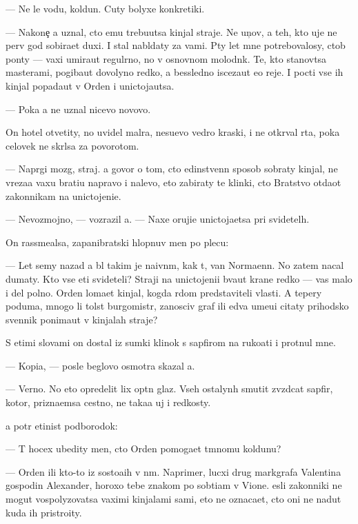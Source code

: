 \documentclass[10pt]{book}
\begin{document}
— Ne le{\y} vodu, koldun. Cuty bolyxe konkretiki.

— Nakone{\c} {\y}a uznal, cto {\y}emu trebu{\y}utsa kinjal{\yi} straje{\y}. Ne {\y}un{\c}ov, a teh, kto uje ne perv{\yi}{\y} god sobira{\y}et duxi. I stal nabl{\io}daty za vami. P{\ia}ty let mne potrebovalosy, ctob{\yi} pon{\ia}ty — vaxi umira{\y}ut regul{\ia}rno, no v osnovnom molodn{\ia}k. Te, kto stanov{\ia}tsa masterami, pogiba{\y}ut dovolyno redko, a bessledno isceza{\y}ut {\y}e{\x}o reje. I pocti vse ih kinjal{\yi} popada{\y}ut v Orden i unictoja{\y}utsa.

— Poka {\y}a ne uznal nicevo novovo.

On hotel otvetity, no uvidel mal{\ia}ra, nesu{\x}evo vedro kraski, i ne otkr{\yi}val rta, poka celovek ne skr{\yi}lsa za povorotom.

— Napr{\ia}gi mozg, straj. {\Y}a govor{\io} o tom, cto {\y}edinstvenn{\yi}{\y} sposob sobraty kinjal{\yi}, ne v{\yi}reza{\y}a vaxu brati{\y}u napravo i nalevo, eto zabiraty te klinki, cto Bratstvo otda{\y}ot zakonnikam na unictojeni{\y}e.

— Nevozmojno, — vozrazil {\y}a. — Naxe oruji{\y}e unictoja{\y}etsa pri svidetel{\ia}h.

On rassme{\y}alsa, zapanibratski hlopnuv men{\ia} po plecu:

— Let semy nazad {\y}a b{\yi}l takim je naivn{\yi}m, kak t{\yi}, van Normaenn. No zatem nacal dumaty. Kto vse eti svideteli? Straji na unictojeni{\y}i b{\yi}va{\y}ut kra{\y}ne redko — vas malo i del polno. Orden loma{\y}et kinjal, kogda r{\ia}dom predstaviteli vlasti. A tepery poduma{\y}, mnogo li tolst{\yi}{\y} burgomistr, zanosciv{\yi}{\y} graf ili {\y}edva ume{\y}u{\x}i{\y} citaty prihodsko{\y} sv{\ia}{\x}ennik ponima{\y}ut v kinjalah straje{\y}?

S etimi slovami on dostal iz sumki klinok s sapfirom na ruko{\y}ati i pro\-t{\ia}\-nul mne.

— Kopi{\y}a, — posle beglovo osmotra skazal {\y}a.

— Verno. No eto opredelit lix op{\yi}tn{\yi}{\y} glaz. Vseh ostalyn{\yi}h smutit zv{\e}zdcat{\yi}{\y} sapfir, kotor{\yi}{\y}, prizna{\y}emsa cestno, ne taka{\y}a uj i redkosty.

{\Y}a pot{\e}r {\x}etinist{\yi}{\y} podborodok:

— T{\yi} hocex ubedity men{\ia}, cto Orden pomoga{\y}et t{\e}mnomu koldunu?

— Orden ili kto-to iz sosto{\y}a{\x}ih v n{\e}m. Naprimer, lucxi{\y} drug markgrafa Valentina gospodin Alexander, horoxo tebe znakom{\yi}{\y} po sob{\yi}ti{\y}am v Vione. {\Y}esli zakonniki ne mogut vospolyzovatsa vaximi kinjalami sami, eto ne oznaca{\y}et, cto oni ne na{\y}dut kuda ih pristro{\y}ity.
\end{document}

